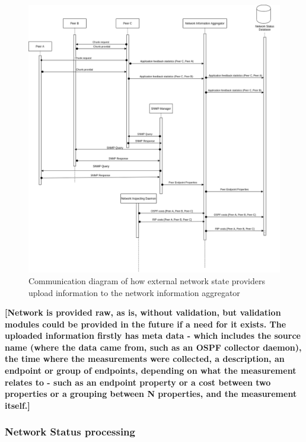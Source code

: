 \begin{figure}[H]
        \centering
        \hspace*{-1em}
        \includegraphics[scale=0.42]{img/communication-info-provisioning-providers.png}
        \caption{Communication diagram of how external network state providers upload information to the network information aggregator}
        \label{fig:provisioning-providers}
\end{figure}


    \textbf{[Network is provided raw, as is, without validation, but validation modules could be provided in the future if a need for it exists. The uploaded information firstly has meta data - which includes the source name (where the data came from, such as an OSPF collector daemon), the time where the measurements were collected, a description, an endpoint or group of endpoints, depending on what the measurement relates to - such as an endpoint property or a cost between two properties or a grouping between N properties, and the measurement itself.]}


\subsubsection{Network Status processing}

